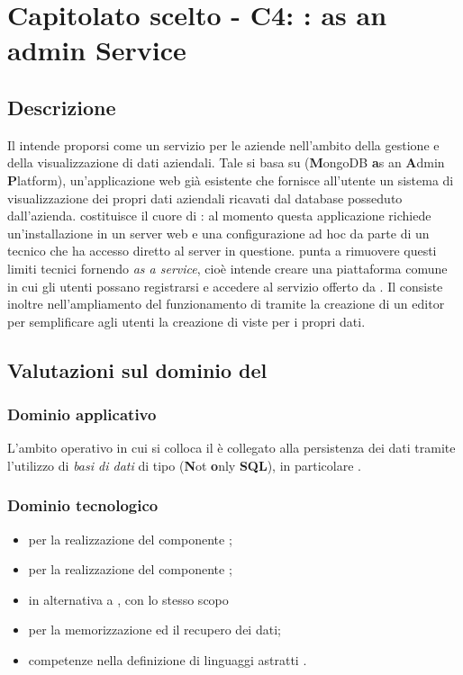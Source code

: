 \section{Capitolato scelto - C4: :  as an admin Service}
\subsection{Descrizione}
Il   intende proporsi come un servizio per le aziende nell'ambito della gestione e della visualizzazione di dati aziendali. 
Tale  si basa su  (\textbf{M}ongoDB \textbf{a}s an \textbf{A}dmin \textbf{P}latform), un'applicazione web gi\`a esistente  che fornisce all'utente un sistema di visualizzazione
dei propri dati aziendali ricavati dal database  posseduto dall'azienda.
 costituisce il cuore di : al momento questa applicazione richiede un'installazione in un server web e 
una configurazione ad hoc da parte di un tecnico che ha accesso diretto al server in questione.  punta a rimuovere 
questi limiti tecnici fornendo  \textit{as a service}, cioè intende creare una piattaforma comune in cui gli utenti possano 
registrarsi e accedere al servizio offerto da . Il  consiste inoltre nell'ampliamento del funzionamento di  tramite la creazione di 
un editor per semplificare agli utenti la creazione di viste per i propri dati.


\subsection{Valutazioni sul dominio del }
\subsubsection{Dominio applicativo}
L'ambito operativo in cui si colloca il  \`e collegato alla persistenza dei dati tramite l'utilizzo
di \textit{basi di dati} di tipo  (\textbf{N}ot \textbf{o}nly \textbf{SQL}), in particolare .

\subsubsection{Dominio tecnologico}
\begin{itemize}
\item {} per la realizzazione del componente ;
\item {} per la realizzazione del componente ;
\item {} in alternativa a , con lo stesso scopo
\item {} per la memorizzazione ed il recupero dei dati;
\item competenze nella definizione di linguaggi astratti .
\end{itemize}


